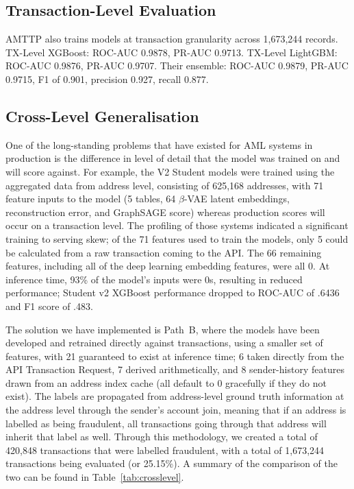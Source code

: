 \documentclass[journal]{IEEEtran}
\begin{document}
\subsection{Transaction-Level Evaluation}

AMTTP also trains models at transaction granularity across 1,673,244 records. TX-Level XGBoost: ROC-AUC 0.9878, PR-AUC 0.9713. TX-Level LightGBM: ROC-AUC 0.9876, PR-AUC 0.9707. Their ensemble: ROC-AUC 0.9879, PR-AUC 0.9715, F1 of 0.901, precision 0.927, recall 0.877.

\subsection{Cross-Level Generalisation}

One of the long-standing problems that have existed for AML systems in production is the difference in level of detail that the model was trained on and will score against. For example, the V2 Student models were trained using the aggregated data from address level, consisting of 625,168 addresses, with 71 feature inputs to the model (5 tables, 64 $\beta$-VAE latent embeddings, reconstruction error, and GraphSAGE score) whereas production scores will occur on a transaction level. The profiling of those systems indicated a significant training to serving skew; of the 71 features used to train the models, only 5 could be calculated from a raw transaction coming to the API. The 66 remaining features, including all of the deep learning embedding features, were all 0. At inference time, 93\% of the model's inputs were 0s, resulting in reduced performance; Student v2 XGBoost performance dropped to ROC-AUC of .6436 and F1 score of .483.

The solution we have implemented is Path~B, where the models have been developed and retrained directly against transactions, using a smaller set of features, with 21 guaranteed to exist at inference time; 6 taken directly from the API Transaction Request, 7 derived arithmetically, and 8 sender-history features drawn from an address index cache (all default to 0 gracefully if they do not exist). The labels are propagated from address-level ground truth information at the address level through the sender's account join, meaning that if an address is labelled as being fraudulent, all transactions going through that address will inherit that label as well. Through this methodology, we created a total of 420,848 transactions that were labelled fraudulent, with a total of 1,673,244 transactions being evaluated (or 25.15\%). A summary of the comparison of the two can be found in Table~\ref{tab:crosslevel}.
\end{document}
